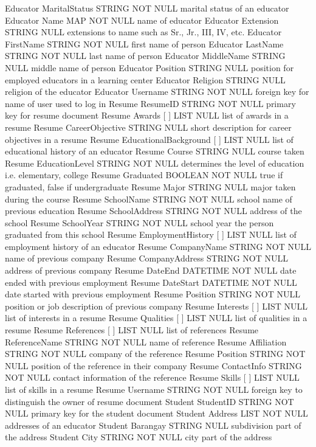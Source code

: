 Educator	MaritalStatus	STRING	NOT NULL	marital status of an educator
Educator	Name { }	MAP	NOT NULL	name of educator
Educator	 	Extension	STRING	NULL	extensions to name such as Sr., Jr., III, IV, etc.
Educator		FirstName	STRING	NOT NULL	first name of person
Educator		LastName	STRING	NOT NULL	last name of person
Educator		MiddleName	STRING	NULL	middle name of person
Educator	Position	STRING	NULL	position for employed educators in a learning center
Educator	Religion	STRING	NULL	religion of the educator
Educator	Username	STRING	NOT NULL	foreign key for name of user used to log in
Resume	ResumeID	STRING	NOT NULL	primary key for resume document
Resume	Awards [ ]	LIST	NULL	list of awards in a resume
Resume	CareerObjective	STRING	NULL	short description for career objectives in a resume
Resume	EducationalBackground [ ] { }	LIST	NULL	list of educational history of an educator
Resume	 	Course	STRING	NULL	course taken
Resume		EducationLevel	STRING	NOT NULL	determines the level of education i.e. elementary, college
Resume		Graduated	BOOLEAN	NOT NULL	true if graduated, false if undergraduate
Resume		Major	STRING	NULL	major taken during the course
Resume		SchoolName	STRING	NOT NULL	school name of previous education
Resume		SchoolAddress	STRING	NOT NULL	address of the school
Resume		SchoolYear	STRING	NOT NULL	school year the person graduated from this school
Resume	EmploymentHistory [ ] { }	LIST	NULL	list of employment history of an educator
Resume	 	CompanyName	STRING	NOT NULL	name of previous company
Resume		CompanyAddress	STRING	NOT NULL	address of previous company
Resume		DateEnd	DATETIME	NOT NULL	date ended with previous employment
Resume		DateStart	DATETIME	NOT NULL	date started with previous employment
Resume		Position	STRING	NOT NULL	position or job description of previous company
Resume	Interests [ ]	LIST	NULL	list of interests in a resume
Resume	Qualities [ ]	LIST	NULL	list of qualities in a resume
Resume	References [ ] { }	LIST	NULL	list of references
Resume	 	ReferenceName	STRING	NOT NULL	name of reference
Resume		Affiliation	STRING	NOT NULL	company of the reference
Resume		Position	STRING	NOT NULL	position of the reference in their company
Resume		ContactInfo	STRING	NOT NULL	contact information of the reference
Resume	Skills [ ]	LIST	NULL	list of skills in a resume
Resume	Username	STRING	NOT NULL	foreign key to distinguish the owner of resume document
Student	StudentID	STRING	NOT NULL	primary key for the student document
Student	Address { }	LIST	NOT NULL	addresses of an educator
Student	 	Barangay	STRING	NULL	subdivision part of the address
Student		City	STRING	NOT NULL	city part of the address
